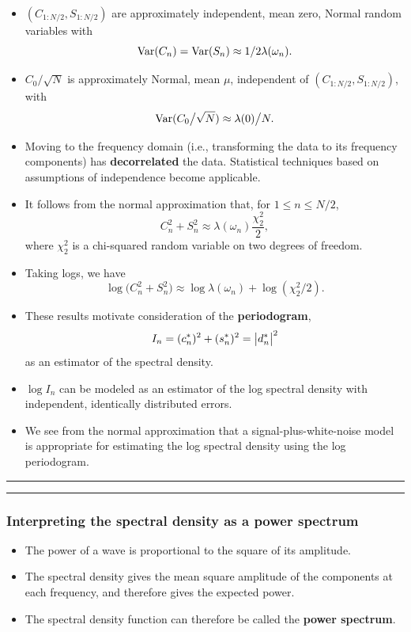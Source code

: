 \documentclass[]{article}
\begin{document}
\begin{itemize}
\item
  \((C_{1:N/2},S_{1:N/2})\) are approximately independent, mean zero,
  Normal random variables with
  \[ \mathrm{Var}(C_n) = \mathrm{Var}(S_n) \approx 1/2 \lambda(\omega_n).\]
\item
  \(C_0\big/ \sqrt{N}\) is approximately Normal, mean \(\mu\),
  independent of \((C_{1:N/2},S_{1:N/2})\), with
  \[\mathrm{Var}(C_0\big/ \sqrt{N}) \approx \lambda(0)\big/ N.\]
\item
  Moving to the frequency domain (i.e., transforming the data to its
  frequency components) has \textbf{decorrelated} the data. Statistical
  techniques based on assumptions of independence become applicable.
\item
  It follows from the normal approximation that, for \(1\le n\le N/2\),
  \[ C_n^2 + S_n^2 \approx \lambda(\omega_n) \frac{\chi^2_2}{2},\] where
  \(\chi^2_2\) is a chi-squared random variable on two degrees of
  freedom.
\item
  Taking logs, we have
  \[ \log\big(C_n^2 + S_n^2 \big) \approx \log \lambda(\omega_n) + \log(\chi^2_2/2).\]
\item
  These results motivate consideration of the \textbf{periodogram},
  \[ I_n = (c_n^*)^2 + (s_n^*)^2 = \big|  d_n^*\big|^2\]
  as an estimator of the spectral density.
\item
  \(\log I_n\) can be modeled as an estimator of the log spectral
  density with independent, identically distributed errors.
\item
  We see from the normal approximation that a signal-plus-white-noise
  model is appropriate for estimating the log spectral density using the
  log periodogram.
\end{itemize}

\begin{center}\rule{0.5\linewidth}{\linethickness}\end{center}

\begin{center}\rule{0.5\linewidth}{\linethickness}\end{center}

\subsubsection{Interpreting the spectral density as a power
spectrum}\label{interpreting-the-spectral-density-as-a-power-spectrum}

\begin{itemize}
\item
  The power of a wave is proportional to the square of its amplitude.
\item
  The spectral density gives the mean square amplitude of the components
  at each frequency, and therefore gives the expected power.
\item
  The spectral density function can therefore be called the
  \textbf{power spectrum}.
\end{itemize}
\end{document}
